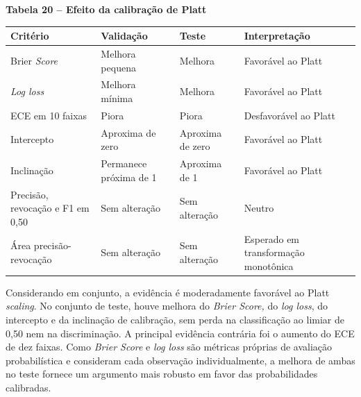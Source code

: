 \textbf{Tabela 20 -- Efeito da calibração de Platt}
\begin{longtable}[]{@{}
			>{\raggedright\arraybackslash}p{}
			>{\raggedright\arraybackslash}p{}
			>{\raggedright\arraybackslash}p{}
			>{\raggedright\arraybackslash}p{}@{}}
		\toprule\noalign{}
		\begin{minipage}[b]{\linewidth}\raggedright
			\textbf{Critério}
		\end{minipage} & \begin{minipage}[b]{\linewidth}\raggedright
			\textbf{Validação}
		\end{minipage} & \begin{minipage}[b]{\linewidth}\raggedright
			\textbf{Teste}
		\end{minipage} & \begin{minipage}[b]{\linewidth}\raggedright
			\textbf{Interpretação}
		\end{minipage} \\
		\midrule\noalign{}
		\endhead
		\bottomrule\noalign{}
		\endlastfoot
		Brier \textit{Score} & Melhora pequena & Melhora & Favorável ao Platt \\
		\textit{Log loss} & Melhora mínima & Melhora & Favorável ao Platt \\
		ECE em 10 faixas & Piora & Piora & Desfavorável ao Platt \\
		Intercepto & Aproxima de zero & Aproxima de zero & Favorável ao Platt \\
		Inclinação & Permanece próxima de 1 & Aproxima de 1 & Favorável ao
		Platt \\
		Precisão, revocação e F1 em 0,50 & Sem alteração & Sem alteração &
		Neutro \\
		Área precisão-revocação & Sem alteração & Sem alteração & Esperado em
		transformação monotônica \\
\end{longtable}

Considerando em conjunto, a evidência é moderadamente favorável ao Platt \textit{scaling}. No conjunto de teste, houve melhora do \textit{Brier Score,} do \textit{log loss}, do intercepto e da inclinação de calibração, sem perda na classificação ao limiar de 0,50 nem na discriminação. A principal evidência contrária foi o aumento do ECE de dez faixas. Como \textit{Brier Score} e \textit{log loss} são métricas próprias de avaliação probabilística e consideram cada observação individualmente, a melhora de ambas no teste fornece um argumento mais robusto em favor das probabilidades calibradas.

